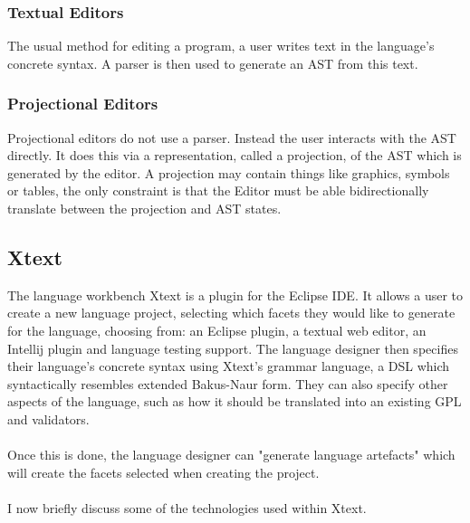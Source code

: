 \documentclass{article}
\begin{document}
\subsubsection{Textual Editors}
The usual method for editing a program, a user writes text in the language's concrete syntax. A parser is then used to generate an AST from this text.
\subsubsection{Projectional Editors}
Projectional editors do not use a parser. Instead the user interacts with the AST directly. It does this via a representation, called a projection, of the AST which is generated by the editor. A projection may contain things like graphics, symbols or tables, the only constraint is that the Editor must be able bidirectionally translate between the projection and AST states. 

\subsection{Xtext}\label{xtext}
The language workbench Xtext is a plugin for the Eclipse IDE. It allows a user to create a new language project, selecting which facets they would like to generate for the language, choosing from: an Eclipse plugin, a textual web editor, an Intellij plugin and language testing support. The language designer then specifies their language's concrete syntax using Xtext's grammar language, a DSL which syntactically resembles extended Bakus-Naur form. They can also specify other aspects of the language, such as how it should be translated into an existing GPL and validators.
\\
\\
Once this is done, the language designer can "generate language artefacts" which will create the facets selected when creating the project. 
\\
\\
I now briefly discuss some of the technologies used within Xtext.
\end{document}
